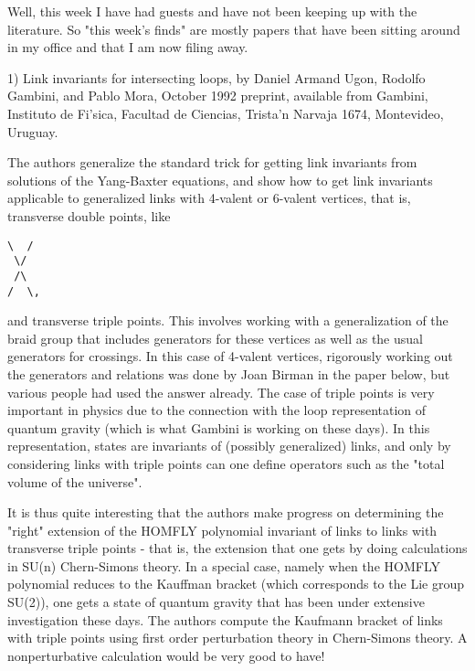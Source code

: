 


Well, this week I have had guests and have not been keeping up with
the literature.  So "this week's finds" are mostly papers that have
been sitting around in my office and that I am now filing away.

1)   Link invariants for intersecting loops, by Daniel Armand Ugon,
Rodolfo Gambini, and Pablo Mora, October 1992 preprint, available
from Gambini, Instituto de Fi'sica, Facultad de Ciencias, 
Trista'n Narvaja 1674, Montevideo, Uruguay.  

The authors generalize the standard trick for getting link invariants
from solutions of the Yang-Baxter equations, and show how to get link
invariants applicable to generalized links with 4-valent or 6-valent
vertices, that is, transverse double points, like

\begin{verbatim}
\  /
 \/
 /\
/  \,
\end{verbatim}
    
and transverse triple points.  This involves 
working with a generalization of the braid group that includes
generators for these vertices as well as the usual generators for 
crossings.  In this case of 4-valent vertices, rigorously working out 
the generators and relations was done by Joan Birman in the paper below,
but various people had used the answer already.  The case of triple points
is very important in physics due to the connection with the loop 
representation of quantum gravity (which is what Gambini is working on 
these days).  In this representation, states are invariants of 
(possibly generalized) links, and only by considering links with 
triple points can one define operators such as the 
"total volume of the universe".  

It is thus quite interesting that the authors make progress on determining
the "right" extension of the HOMFLY polynomial invariant of
links to links with transverse triple points - that is, the
extension that one gets by doing calculations in SU(n) Chern-Simons theory.  
In a special case, namely when the HOMFLY polynomial reduces to the
Kauffman bracket (which corresponds to the Lie group SU(2)), one
gets a state of quantum gravity that has been under extensive investigation
these days.  The authors compute the Kaufmann bracket of links
with triple points using first order perturbation theory in Chern-Simons
theory.  A nonperturbative calculation would be very good to have!

